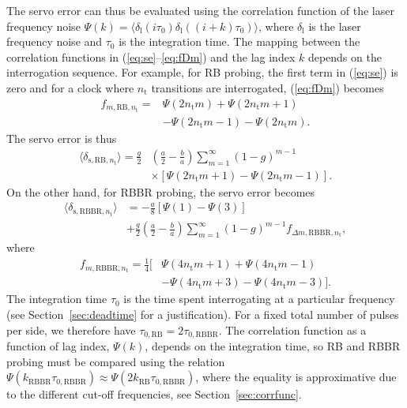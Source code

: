 \documentclass[10pt,a4paper]{iopart}
\newcommand{\eqref}[1]{(\ref{#1})}
\begin{document}
The servo error can thus be evaluated using the correlation function of the laser frequency noise $\Psi(k) = \langle \delta_\mathrm{l}(i\tau_0) \delta_\mathrm{l}((i+k)\tau_0)\rangle$, where $\delta_\mathrm{l}$ is the laser frequency noise and $\tau_0$ is the integration time. The mapping between the correlation functions in (\ref{eq:se}--\ref{eq:fDm}) and the lag index $k$ depends on the interrogation sequence. For example, for RB probing, the first term in \eqref{eq:se} is zero and for a clock where $n_\mathrm{t}$ transitions are interrogated, \eqref{eq:fDm} becomes
\begin{eqnarray} %
f_{m,\mathrm{RB},n_\mathrm{t}} =  & \Psi(2 n_\mathrm{t} m) + \Psi(2 n_\mathrm{t} m+1)
    \nonumber \\
&  - \Psi(2 n_\mathrm{t} m-1) - \Psi(2 n_\mathrm{t} m) .
\end{eqnarray}
The servo error is thus
\begin{eqnarray}
\langle \delta_{\mathrm{s},\mathrm{RB},n_\mathrm{t}}\rangle = \frac{g}{2} & \left( \frac{a}{2} - \frac{b}{a} \right)
 \sum_{m=1}^\infty (1-g)^{m-1} \nonumber \\
& \times \left[  \Psi(2 n_\mathrm{t} m+1) - \Psi(2 n_\mathrm{t} m-1)\right]. \label{eq:seRB}
\end{eqnarray}
On the other hand, for RBBR probing, the servo error becomes
\begin{eqnarray}
\langle \delta_{\mathrm{s},\mathrm{RBBR},n_\mathrm{t}}\rangle & =  - \frac{a}{8}
\left[ \Psi(1) -\Psi(3) \right] \nonumber \\
 & + \frac{g}{2} \left( \frac{a}{2} - \frac{b}{a} \right) \sum_{m=1}^\infty (1-g)^{m-1} f_{\Delta m,\mathrm{RBBR},n_\mathrm{t}}, \label{eq:seRBBR}
\end{eqnarray}
where
\begin{eqnarray}
f_{m,\mathrm{RBBR},n_\mathrm{t}} =
\frac{1}{4} [ & \Psi(4 n_\mathrm{t} m+1) + \Psi(4 n_\mathrm{t} m-1) \nonumber \\
& - \Psi(4 n_\mathrm{t} m+3) - \Psi(4 n_\mathrm{t} m -3) ]. \label{eq:fDmRBBR}
\end{eqnarray}
The integration time $\tau_0$ is the time spent interrogating at a particular frequency (see Section~\ref{sec:deadtime} for a justification). For a fixed total number of pulses per side, we therefore have $\tau_{0,\mathrm{RB}} = 2 \tau_{0,\mathrm{RBBR}}$. The correlation function as a function of lag index, $\Psi(k)$, depends on the integration time, so RB and RBBR probing must be compared using the relation $\Psi(k_\mathrm{RBBR} \tau_{0,\mathrm{RBBR}}) \approx \Psi(2 k_\mathrm{RB} \tau_{0,\mathrm{RBBR}})$, where the equality is approximative due to the different cut-off frequencies, see Section~\ref{sec:corrfunc}.
\end{document}
